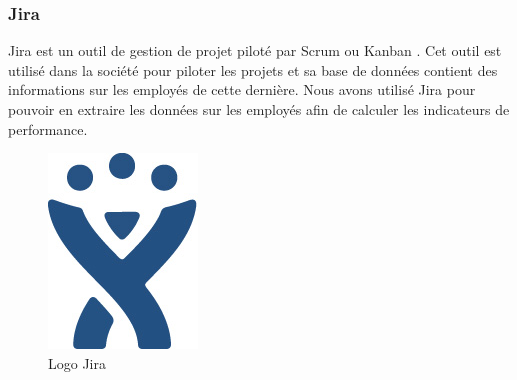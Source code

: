 \subsubsection{Jira}
\noindent\begin{minipage}{0.69\textwidth}
Jira est un outil de gestion de projet piloté par Scrum ou Kanban \footnotemark. Cet outil est utilisé dans la société pour piloter les projets et sa base de données contient des informations sur les employés de cette dernière. Nous avons utilisé Jira pour pouvoir en extraire les données sur les employés afin de calculer les indicateurs de performance.
\end{minipage}
\begin{minipage}{0.3\textwidth}
\begin{figure}[H]
  \centering
  \includegraphics[scale=0.3]{figures/logo/jira.jpg}
  \caption{Logo Jira}
  \label{code32}
\end{figure}
\end{minipage}
